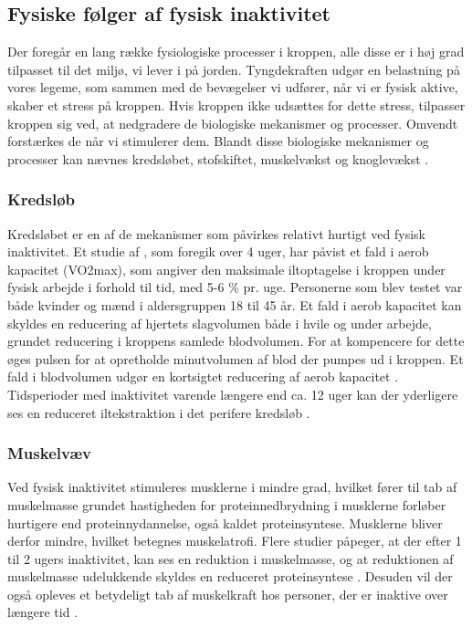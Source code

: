\subsection{Fysiske følger af fysisk inaktivitet}
Der foregår en lang række fysiologiske processer i kroppen, alle disse er i høj grad tilpasset til det miljø, vi lever i på jorden. 
Tyngdekraften udgør en belastning på vores legeme, som sammen med de bevægelser vi udfører, når vi er fysisk aktive, skaber et stress på kroppen. 
Hvis kroppen ikke udsættes for dette stress, tilpasser kroppen sig ved, at nedgradere de biologiske mekanismer og processer. Omvendt forstærkes de når vi stimulerer dem. 
Blandt disse biologiske mekanismer og processer kan nævnes kredsløbet, stofskiftet, muskelvækst og knoglevækst \citep{motionsraad2007}.

\subsubsection{Kredsløb}
Kredsløbet er en af de mekanismer som påvirkes relativt hurtigt ved fysisk inaktivitet. 
Et studie af \citeauthor{Convertino1995}, som foregik over 4 uger, har påvist et fald i aerob kapacitet (VO2max), som angiver den maksimale iltoptagelse i kroppen under fysisk arbejde i forhold til tid, med 5-6 \% pr. uge. 
Personerne som blev testet var både kvinder og mænd i aldersgruppen 18 til 45 år. 
Et fald i aerob kapacitet kan skyldes en reducering af hjertets slagvolumen både i hvile og under arbejde, grundet reducering i kroppens samlede blodvolumen. 
For at kompencere for dette øges pulsen for at opretholde minutvolumen af blod der pumpes ud i kroppen. 
Et fald i blodvolumen udgør en kortsigtet reducering af aerob kapacitet \citep{Convertino1995}. 
Tidsperioder med inaktivitet varende længere end ca. 12 uger kan der yderligere ses en reduceret iltekstraktion i det perifere kredsløb \citep{Coyle1985}.

\subsubsection{Muskelvæv}
Ved fysisk inaktivitet stimuleres musklerne i mindre grad, hvilket fører til tab af muskelmasse grundet hastigheden for proteinnedbrydning i musklerne forløber hurtigere end proteinnydannelse, også kaldet proteinsyntese. 
Musklerne bliver derfor mindre, hvilket betegnes muskelatrofi. 
Flere studier påpeger, at der efter 1 til 2 ugers inaktivitet, kan ses en reduktion i muskelmasse, og at reduktionen af muskelmasse udelukkende skyldes en reduceret proteinsyntese \citep{Douglas2006, Bloomfield1995}. 
Desuden vil der også opleves et betydeligt tab af muskelkraft hos personer, der er inaktive over længere tid \citep{Bloomfield1995}. 

